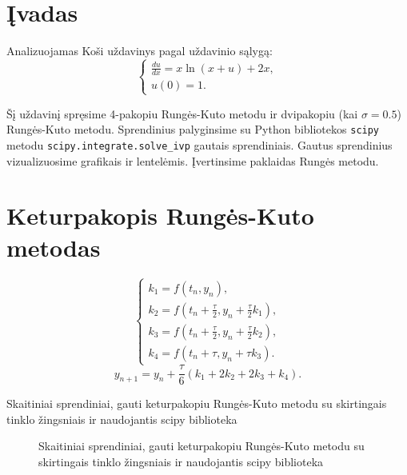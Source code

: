 \documentclass[]{VUMIFTemplateClass}
\begin{document}
\onehalfspacing


\tableofcontents
\onehalfspacing

\section{Įvadas}
Analizuojamas Koši uždavinys pagal uždavinio sąlygą:
\begin{equation}
    \begin{cases}
        \frac{du}{dx} = x \ln(x + u) + 2x,\\
        u(0) = 1.
    \end{cases}
\end{equation}

Šį uždavinį spręsime 4-pakopiu Rungės-Kuto metodu ir dvipakopiu (kai $\sigma = 0.5$) Rungės-Kuto metodu. Sprendinius palyginsime su Python bibliotekos \texttt{scipy} metodu \texttt{scipy.integrate.solve\_ivp} gautais sprendiniais. Gautus sprendinius vizualizuosime grafikais ir lentelėmis. Įvertinsime paklaidas Rungės metodu.

\section{Keturpakopis Rungės-Kuto metodas}
\begin{equation}
    \begin{cases}
        k_1 = f(t_n, y_n),\\
        k_2 = f(t_n + \frac{\tau}{2}, y_n + \frac{\tau}{2} k_1),\\
        k_3 = f(t_n + \frac{\tau}{2}, y_n + \frac{\tau}{2} k_2),\\
        k_4 = f(t_n + \tau, y_n + \tau k_3).
    \end{cases}
\end{equation}
\[ y_{n+1} = y_n + \frac{\tau}{6}(k_1 + 2k_2 + 2k_3 + k_4). \]

\begin{table}[H]
    \begin{center}
        
    \end{center}
    \label{rt4tbl}
    \caption{Skaitiniai sprendiniai, gauti keturpakopiu Rungės-Kuto metodu su skirtingais tinklo žingsniais ir naudojantis scipy biblioteka}
\end{table}

\begin{figure}[H]
    \begin{center}
        
    \end{center}
    \caption{Skaitiniai sprendiniai, gauti keturpakopiu Rungės-Kuto metodu su skirtingais tinklo žingsniais ir naudojantis scipy biblioteka}
\end{figure}
\end{document}
